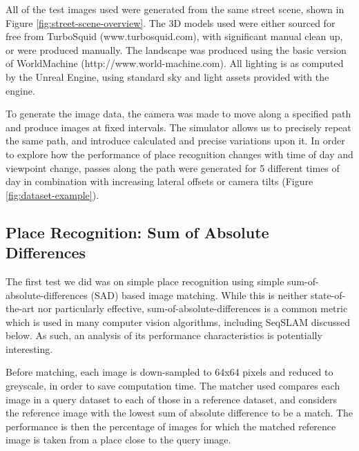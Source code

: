 \documentclass[letterpaper, 10 pt, conference]{ieeeconf}  %
\begin{document}
All of the test images used were generated from the same street scene, shown in Figure \ref{fig:street-scene-overview}. The 3D models used were either sourced for free from TurboSquid (www.turbosquid.com), with significant manual clean up, or were produced manually. The landscape was produced using the basic version of WorldMachine (http://www.world-machine.com). All lighting is as computed by the Unreal Engine, using standard sky and light assets provided with the engine.

To generate the image data, the camera was made to move along a specified path and produce images at fixed intervals.
The simulator allows us to precisely repeat the same path, and introduce calculated and precise variations upon it.
In order to explore how the performance of place recognition changes with time of day and viewpoint change, passes along the path were generated for 5 different times of day in combination with increasing lateral offsets or camera tilts (Figure \ref{fig:dataset-example}).


\subsection{Place Recognition: Sum of Absolute Differences}

The first test we did was on simple place recognition using simple sum-of-absolute-differences (SAD) based image matching. While this is neither state-of-the-art nor particularly effective, sum-of-absolute-differences is a common metric which is used in many computer vision algorithms, including SeqSLAM discussed below. As such, an analysis of its performance characteristics is potentially interesting.

Before matching, each image is down-sampled to 64x64 pixels and reduced to greyscale, in order to save computation time. The matcher used compares each image in a query dataset to each of those in a reference dataset, and considers the reference image with the lowest sum of absolute difference to be a match. The performance is then the percentage of images for which the matched reference image is taken from a place close to the query image.
\end{document}
